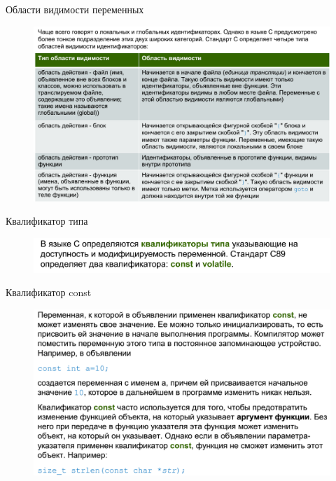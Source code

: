 \documentclass{beamer}
\begin{document}
\begin{frame}{Области видимости переменных}
\begin{figure}[h]
\centering
\includegraphics[scale=0.4]{images/lec02-pic05.png}
\end{figure}
\end{frame}

\begin{frame}{Квалификатор типа}
\begin{figure}[h]
\centering
\includegraphics[scale=0.4]{images/lec02-pic06.png}
\end{figure}
\end{frame}

\begin{frame}{Квалификатор const}
\begin{figure}[h]
\centering
\includegraphics[scale=0.4]{images/lec02-pic07.png}
\end{figure}
\end{frame}
\end{document}
